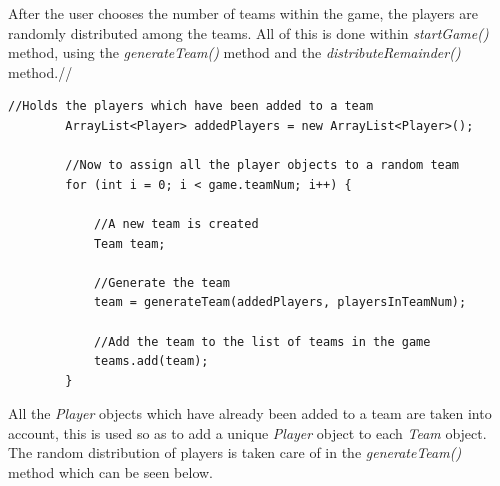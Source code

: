 \documentclass[a4paper,12pt]{extarticle}
\begin{document}
\noindent After the user chooses the number of teams within the game, the players are randomly distributed among the teams. All of this is done within \textit{startGame()} method, using the \textit{generateTeam()} method and the \textit{distributeRemainder()} method.//
\vspace{4mm}

\newpage
\begin{lstlisting}
//Holds the players which have been added to a team
        ArrayList<Player> addedPlayers = new ArrayList<Player>();

        //Now to assign all the player objects to a random team
        for (int i = 0; i < game.teamNum; i++) {

            //A new team is created
            Team team;

            //Generate the team
            team = generateTeam(addedPlayers, playersInTeamNum);

            //Add the team to the list of teams in the game
            teams.add(team);
        }
\end{lstlisting}
\vspace{4mm}

\noindent All the \textit{Player} objects which have already been added to a team are taken into account, this is used so as to add a unique \textit{Player} object to each \textit{Team} object. The random distribution of players is taken care of in the \textit{generateTeam()} method which can be seen below.\\
\end{document}
